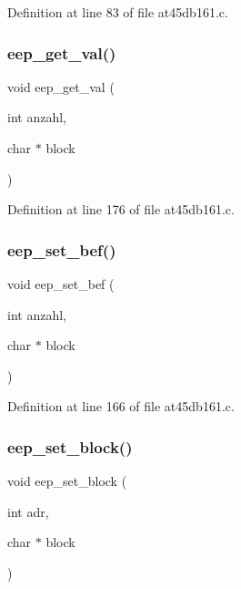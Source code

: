 Definition at line 83 of file at45db161.\+c.

\mbox{\label{at45db161_8c_a4d837cf90e56cc5f0e6bb139e597804f}} 
\subsubsection{eep\+\_\+get\+\_\+val()}
{\footnotesize\ttfamily void eep\+\_\+get\+\_\+val (\begin{DoxyParamCaption}\item[{int}]{anzahl,  }\item[{char $\ast$}]{block }\end{DoxyParamCaption})}



Definition at line 176 of file at45db161.\+c.

\mbox{\label{at45db161_8c_ac030895b6402cfcf0121cdc98ee7ef6d}} 
\subsubsection{eep\+\_\+set\+\_\+bef()}
{\footnotesize\ttfamily void eep\+\_\+set\+\_\+bef (\begin{DoxyParamCaption}\item[{int}]{anzahl,  }\item[{char $\ast$}]{block }\end{DoxyParamCaption})}



Definition at line 166 of file at45db161.\+c.

\mbox{\label{at45db161_8c_ad2bdb37e9ffea7236eeef049359d3214}} 
\subsubsection{eep\+\_\+set\+\_\+block()}
{\footnotesize\ttfamily void eep\+\_\+set\+\_\+block (\begin{DoxyParamCaption}\item[{int}]{adr,  }\item[{char $\ast$}]{block }\end{DoxyParamCaption})}



